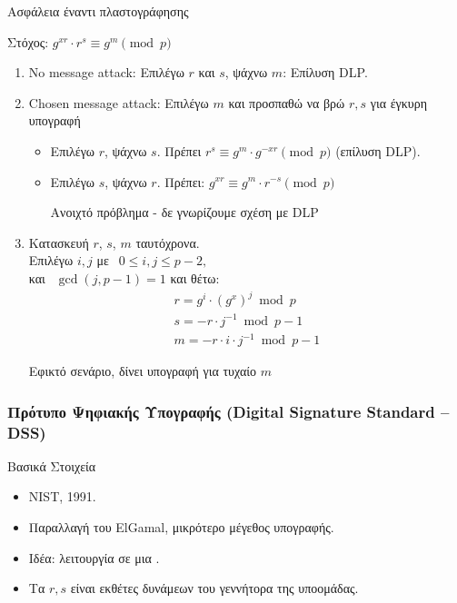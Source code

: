 \documentclass[handout]{beamer}
\begin{document}
\begin{frame}[allowframebreaks]{Ασφάλεια έναντι πλαστογράφησης}

\alert{Στόχος: $g^{xr} \cdot r^s \equiv g^{m} \pmod p$}

\begin{enumerate}
\item No message attack: Επιλέγω $r$ και $s$, ψάχνω $m$: Επίλυση DLP.

\item Chosen message attack: Επιλέγω $m$ και προσπαθώ να βρώ $r,s$ για έγκυρη υπογραφή
\begin{itemize}
\item Επιλέγω $r$, ψάχνω $s$. Πρέπει
$r^s \equiv g^{m} \cdot g^{-xr} \pmod p$ (επίλυση DLP).

\item Επιλέγω $s$, ψάχνω $r$. Πρέπει:
$g^{xr}  \equiv g^{m} \cdot r^{-s} \pmod p$

Ανοιχτό πρόβλημα - δε γνωρίζουμε σχέση με DLP 
\end{itemize}
 
 
\framebreak

\item Κατασκευή $r$, $s$, $m$ ταυτόχρονα.\\
Επιλέγω $i,j$
με $ \ \ 0\leq i,j \leq p-2, $\\
και $ \ \  \gcd(j,p-1)=1$  και θέτω: \\
\begin{align*}
 r=g^{i} \cdot (g^{x})^j \bmod p \\
 s = -r\cdot j^{-1} \bmod {p-1} \\
 m = -r\cdot i\cdot j^{-1} \bmod {p-1}
\end{align*}


\alert{Εφικτό σενάριο, δίνει υπογραφή για τυχαίο $m$}


\end{enumerate}
 
\end{frame}

\begin{frame}
\frametitle{Πρότυπο Ψηφιακής Υπογραφής (Digital Signature Standard -- DSS)} 

\begin{block}{Βασικά Στοιχεία}
\begin{itemize}
\item NIST, 1991.
\pause
\item Παραλλαγή του ElGamal, μικρότερο μέγεθος υπογραφής.
\pause
\item Ιδέα: λειτουργία σε μια .
\pause
\item Τα $r, s$ είναι εκθέτες δυνάμεων του γεννήτορα της υποομάδας.
\end{itemize}
\end{block}
\end{frame}
\end{document}
